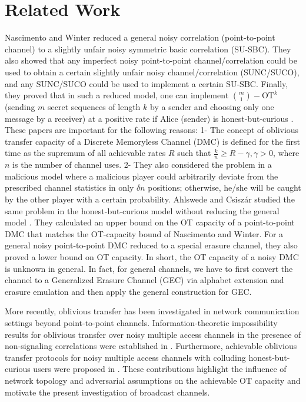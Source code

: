 \documentclass[runningheads]{llncs}
\newcounter{protocol}
\begin{document}
\section{Related Work}\label{Sec: rel}
Nascimento and Winter reduced a general noisy correlation (point-to-point channel) to a slightly unfair noisy symmetric basic correlation (SU-SBC). They also showed that any imperfect noisy point-to-point channel/correlation could be used to obtain a certain slightly unfair noisy channel/correlation (SUNC/SUCO), and any SUNC/SUCO could be used to implement a certain SU-SBC. Finally, they proved that in such a reduced model, one can implement $\binom{m}{1}-\text{OT}^k$ (sending $m$ secret sequences of length $k$ by a sender and choosing only one message by a receiver) at a positive rate if Alice (sender) is honest-but-curious \cite{Winter1,Winter3}. These papers are important for the following reasons: 1- The concept of oblivious transfer capacity of a Discrete Memoryless Channel (DMC) is defined for the first time as the supremum of all achievable rates $R$ such that $\frac{k}{n}\geq R - \gamma, \gamma> 0$, where $n$ is the number of channel uses. 2- They also considered the problem in a malicious model where a malicious player could arbitrarily deviate from the prescribed channel statistics in only $\delta n$ positions; otherwise, he/she will be caught by the other player with a certain probability. Ahlswede and Csisz\'ar studied the same problem in the honest-but-curious model without reducing the general model \cite{Rudolf1}. They calculated an upper bound on the OT capacity of a point-to-point DMC that matches the OT-capacity bound of Nascimento and Winter. For a general noisy point-to-point DMC reduced to a special erasure channel, they also proved a lower bound on OT capacity. In short, the OT capacity of a noisy DMC is unknown in general. In fact, for general channels, we have to first convert the channel to a Generalized Erasure Channel (GEC) via alphabet extension and erasure emulation and then apply the general construction for GEC.

More recently, oblivious transfer has been investigated in network communication settings beyond point-to-point channels. Information-theoretic impossibility results for oblivious transfer over noisy multiple access channels in the presence of non-signaling correlations were established in \cite{Hadi-ISIT26}. Furthermore, achievable oblivious transfer protocols for noisy multiple access channels with colluding honest-but-curious users were proposed in \cite{Hadi-EW26}. These contributions highlight the influence of network topology and adversarial assumptions on the achievable OT capacity and motivate the present investigation of broadcast channels.
\end{document}
